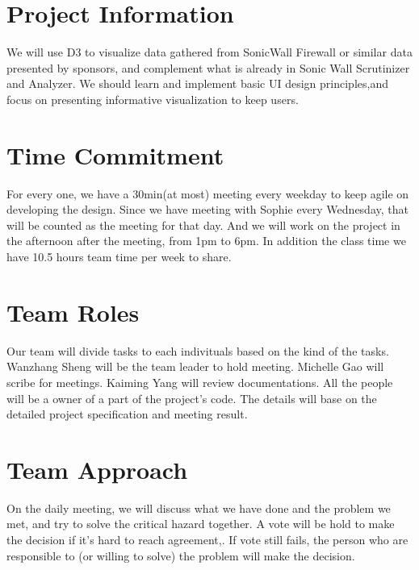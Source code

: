 \documentclass[paper=a4, fontsize=11pt]{scrartcl} %
\begin{document}
\maketitle %

\section{Project Information} %
\label{sec:project_information}
We will use D3 to visualize data gathered from SonicWall Firewall or similar data presented by sponsors, and complement what is already in Sonic Wall Scrutinizer and Analyzer. We should learn and implement basic UI design principles,and focus on presenting informative visualization to keep users.

\section{Time Commitment} %
\label{sec:time_commitment}
For every one, we have a 30min(at most) meeting every weekday to keep agile on developing the design.
Since we have meeting with Sophie every Wednesday, that will be counted as the meeting for that day.
And we will work on the project in the afternoon after the meeting, from 1pm to 6pm.
In addition the class time we have 10.5 hours team time per week to share.

\section{Team Roles} %
\label{sec:team_roles}
Our team will divide tasks to each indivituals based on the kind of the tasks.
Wanzhang Sheng will be the team leader to hold meeting.
Michelle Gao will scribe for meetings.
Kaiming Yang will review documentations.
All the people will be a owner of a part of the project's code.
The details will base on the detailed project specification and meeting result.

\section{Team Approach} %
\label{sec:team_approach}
On the daily meeting, we will discuss what we have done and the problem we met, and try to solve the critical hazard together.  A vote will be hold to make the decision if it's hard to reach agreement,. If vote still fails, the person who are responsible to (or willing to solve) the problem will make the decision.
\end{document}

